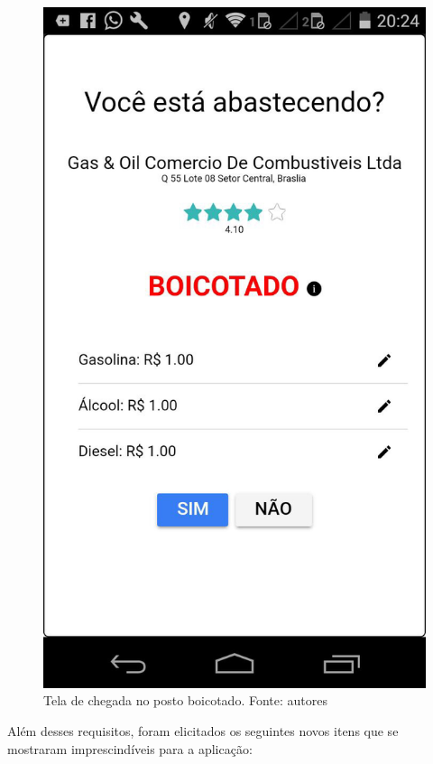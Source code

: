 \begin{figure}[H]
    \centering
    \includegraphics[scale=0.3]{figuras/chegou-posto.jpg}
    \caption[Tela de chegada no posto boicotado]{Tela de chegada no posto boicotado. Fonte: autores}
    \label{img:chegou-posto-boicotado}
\end{figure}

Além desses requisitos, foram elicitados os seguintes novos itens que se mostraram imprescindíveis para a aplicação:

